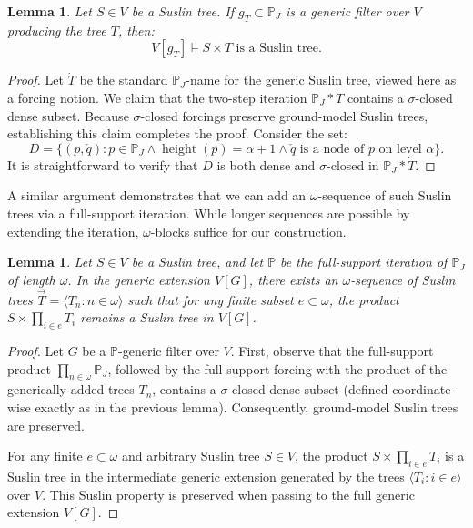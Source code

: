 \documentclass[a4paper,11pt]{article}
\newtheorem{lemma}[theorem]{Lemma}
\newcommand{\forceP}{\mathbb{P}}
\begin{document}
\begin{lemma}
 Let $S \in V$ be a Suslin tree. If $g_T \subset \forceP_J$ is a generic filter over $V$ producing the tree $T$, then:
 $$V[g_T] \models S \times T \text{ is a Suslin tree.}$$
\end{lemma}

\begin{proof}
Let $\dot{T}$ be the standard $\forceP_J$-name for the generic Suslin tree, viewed here as a forcing notion. We claim that the two-step iteration $\forceP_J \ast \dot{T}$ contains a $\sigma$-closed dense subset. Because $\sigma$-closed forcings preserve ground-model Suslin trees, establishing this claim completes the proof. Consider the set:
$$ D = \{ (p, \check{q}) : p \in \forceP_J \land \operatorname{height}(p) = \alpha + 1 \land \check{q} \text{ is a node of } p \text{ on level } \alpha \}. $$
It is straightforward to verify that $D$ is both dense and $\sigma$-closed in $\forceP_J \ast \dot{T}$.
\end{proof}

A similar argument demonstrates that we can add an $\omega$-sequence of such Suslin trees via a full-support iteration. While longer sequences are possible by extending the iteration, $\omega$-blocks suffice for our construction.

\begin{lemma}\label{ManySuslinTrees}
 Let $S \in V$ be a Suslin tree, and let $\forceP$ be the full-support iteration of $\forceP_J$ of length $\omega$. In the generic extension $V[G]$, there exists an $\omega$-sequence of Suslin trees $\vec{T} = \langle T_n : n \in \omega \rangle$ such that for any finite subset $e \subset \omega$, the product $S \times \prod_{i \in e} T_i$ remains a Suslin tree in $V[G]$.
\end{lemma}

\begin{proof}
Let $G$ be a $\forceP$-generic filter over $V$. First, observe that the full-support product $\prod_{n \in \omega} \forceP_J$, followed by the full-support forcing with the product of the generically added trees $T_n$, contains a $\sigma$-closed dense subset (defined coordinate-wise exactly as in the previous lemma). Consequently, ground-model Suslin trees are preserved. 

For any finite $e \subset \omega$ and arbitrary Suslin tree $S \in V$, the product $S \times \prod_{i \in e} T_i$ is a Suslin tree in the intermediate generic extension generated by the trees $\langle T_i : i \in e \rangle$ over $V$. This Suslin property is preserved when passing to the full generic extension $V[G]$.
\end{proof}
\end{document}
